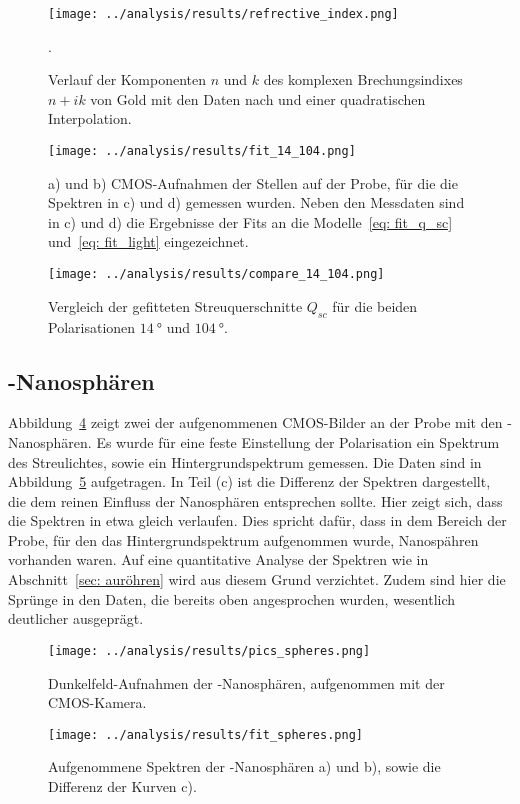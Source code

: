 \begin{figure}
  \centering
  \texttt{[image: ../analysis/results/refrective\_index.png]}
  \caption{Verlauf der Komponenten $n$ und $k$ des komplexen Brechungsindixes $n + i k$
  von Gold mit den Daten nach \cite{ref_index_au} und einer quadratischen Interpolation.}.
  \label{fig: ref_index}
\end{figure}


\begin{figure}
  \centering
  \texttt{[image: ../analysis/results/fit\_14\_104.png]}
  \caption{a) und b) CMOS-Aufnahmen der Stellen auf der Probe, für die die Spektren in c) und d)
  gemessen wurden. Neben den Messdaten sind in c) und d) die Ergebnisse der Fits an die Modelle~\eqref{eq: fit_q_sc}
  und~\eqref{eq: fit_light} eingezeichnet.}
  \label{fig: au_röhren_fits}
\end{figure}

\begin{figure}
  \centering
  \texttt{[image: ../analysis/results/compare\_14\_104.png]}
  \caption{Vergleich der gefitteten Streuquerschnitte $Q_{sc}$ für die beiden Polarisationen $\SI{14}{\degree}$ und $\SI{104}{\degree}$.}
  \label{fig: compare_q_sc}
\end{figure}



\subsection{-Nanosphären}
Abbildung~\ref{fig: au_sphären_bilder} zeigt zwei der aufgenommenen CMOS-Bilder an der Probe mit den -Nanosphären.
Es wurde für eine feste Einstellung der Polarisation ein Spektrum des Streulichtes, sowie ein
Hintergrundspektrum gemessen. Die Daten sind in Abbildung~\ref{fig: au_sphären_data} aufgetragen. In Teil (c) ist die Differenz
der Spektren dargestellt, die dem reinen Einfluss der Nanosphären entsprechen sollte.
Hier zeigt sich, dass die Spektren in etwa gleich verlaufen.
Dies spricht dafür, dass in dem Bereich der Probe, für den das Hintergrundspektrum aufgenommen wurde, Nanospähren
vorhanden waren.
Auf eine quantitative Analyse der Spektren wie in Abschnitt~\ref{sec: auröhren} wird aus diesem Grund verzichtet.
Zudem sind hier die Sprünge in den Daten, die bereits oben angesprochen wurden, wesentlich deutlicher
ausgeprägt.

\begin{figure}
  \centering
  \texttt{[image: ../analysis/results/pics\_spheres.png]}
  \caption{Dunkelfeld-Aufnahmen der -Nanosphären, aufgenommen mit der CMOS-Kamera.}
  \label{fig: au_sphären_bilder}
\end{figure}

\begin{figure}
  \centering
  \texttt{[image: ../analysis/results/fit\_spheres.png]}
  \caption{Aufgenommene Spektren der -Nanosphären a) und b), sowie die Differenz der Kurven c).}
  \label{fig: au_sphären_data}
\end{figure}
